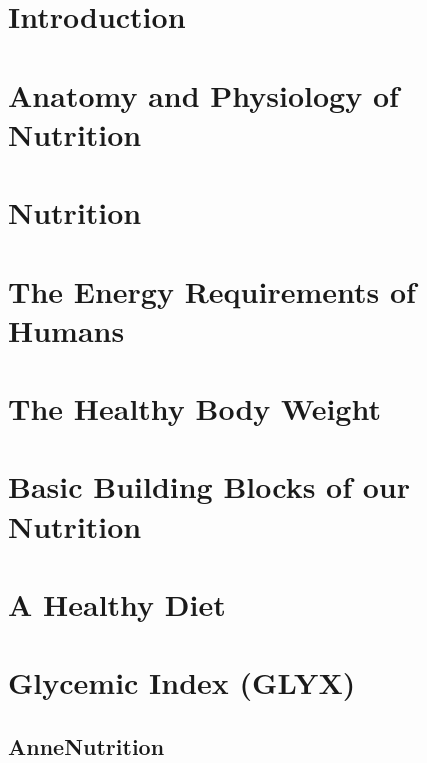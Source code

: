 \documentclass[../main.tex]{subfiles}
\begin{document}
\chapter{Introduction}


\chapter{Anatomy and Physiology of Nutrition}


\chapter{Nutrition}


\chapter{The Energy Requirements of Humans}


\chapter{The Healthy Body Weight}


\chapter{Basic Building Blocks of our Nutrition}


\chapter{A Healthy Diet}



\chapter{Glycemic Index (GLYX)}





\section{AnneNutrition}




\label{SpecialFoods} %





\label{FoodSoy}
\end{document}
